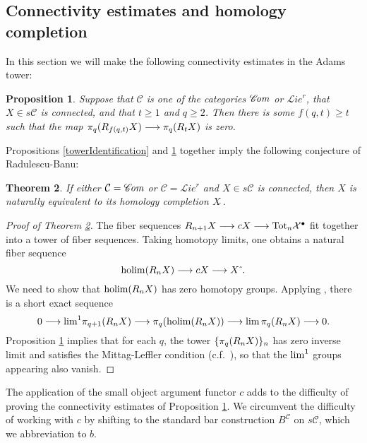 \documentclass[11pt]{amsart} \renewcommand{\baselinestretch}{1.2}
\theoremstyle{plain}
\newtheorem{thm}{Theorem}[section] %
\newtheorem{prop}[thm]{Proposition}
\numberwithin{equation}{section} %
\theoremstyle{plain}
\newtheorem{thm}{Theorem}[chapter] %
\newtheorem{prop}[thm]{Proposition}
\numberwithin{equation}{chapter} %
\DeclareMathOperator*{\holim}{holim}
\renewcommand{\to}{\longrightarrow}
\newcommand{\scrL}{\mathscr{L}}
\newcommand{\scrC}{\mathscr{C}}
\newcommand{\calx}{\mathcal{X}}
\newcommand{\calc}{\mathcal{C}}
\newcommand{\citeBOX}[2][]{\cite[\mbox{#1}]{#2}}
\newcommand{\algs}{{\scrC\!\textit{\normalfont\textit{om}}}}
\newcommand{\restliealgs}{{\scrL\!\textit{ie}^\textit{r}}}
\newcommand{\algcat}{{\calc}}%
\newcommand{\dupdown}[2]{R_{\smash{#1}}}
\newcommand{\algCat}{\calc}
\newcommand{\barConstructionMightAbbreviate}{b}
\newcommand{\SubsectionOrSection}[1]{\subsection{#1}}
\begin{document}
\begin{Bousfield-Kan spectral sequence}
\SubsectionOrSection{Connectivity estimates and homology completion}
\label{sec:connectivityAnalysis}
In this section we will  make the following connectivity estimates in the Adams tower:
\begin{prop}
\label{convergenceProp}
Suppose that $\algcat$ is one of the categories $\algs$ or $\restliealgs$, that $X\in s\algcat$ is connected, and that  $t\geq1$ and $q\geq2$. Then there is some $f(q,t)\geq t$ such that the map $\pi_q(\dupdown{f(q,t)}{c}X)\to\pi_q(\dupdown{t}{c}X)$ is zero.
\end{prop}
\noindent Propositions \ref{towerIdentification} and \ref{convergenceProp} together imply
the following conjecture of Radulescu-Banu:
\begin{thm}
\label{completenesstheorem}
If either $\algcat=\algs$ or $\algcat=\restliealgs$ and $X\in s\algcat$ is connected, then $X$ is naturally equivalent to its homology completion $X\hat{\ }$.
\end{thm}
\begin{proof}[Proof of Theorem \ref{completenesstheorem}]
The fiber sequences $\dupdown{n+1}{c}X\to cX\to \textup{Tot}_n\calx^\bullet$ fit together into a tower of fiber sequences. Taking homotopy limits, one obtains a natural fiber sequence
\[\holim (\dupdown{n}{c}X)\to cX\to X\hat{\ }.\]
We need to show that $\holim (\dupdown{n}{c}X)$ has zero homotopy groups.
Applying \cite[Proposition 6.14]{goerss-jardine.pdf}, there is a short exact sequence
\[0\to \textup{lim}^1\pi_{q+1}(\dupdown{n}{c}X)\to \pi_q(\holim (\dupdown{n}{c}X))\to \textup{lim}\,\pi_{q}(\dupdown{n}{c}X)\to 0.\]
Proposition \ref{convergenceProp} implies that for each $q$, the tower $\{\pi_{q}(\dupdown{n}{c}X)\}_n$ has zero inverse limit and satisfies the Mittag-Leffler condition (c.f.\ \citeBOX[p.~264]{YellowMonster}), so that the $\textup{lim}^1$ groups appearing also vanish.
\end{proof}
The application of the small object argument functor $c$ adds to the difficulty of proving the connectivity estimates of Proposition \ref{convergenceProp}. We circumvent the difficulty of working with $c$ by shifting to the standard bar construction $B^{\algCat}$ on $s\algCat$, which we abbreviation to $\barConstructionMightAbbreviate $.


\end{Bousfield-Kan spectral sequence}
\end{document}

